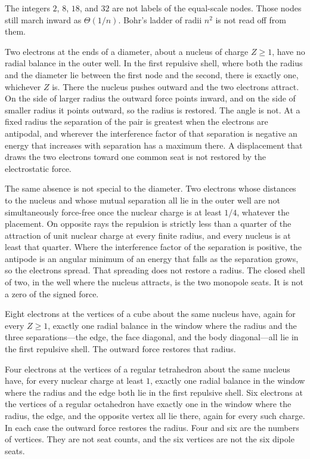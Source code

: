 \documentclass[a4paper]{article}
\begin{document}
The integers \(2\), \(8\), \(18\), and \(32\) are not labels of the equal-scale nodes. Those nodes still march inward as \(\Theta(1/n)\). Bohr's ladder of radii \(n^{2}\) is not read off from them.

Two electrons at the ends of a diameter, about a nucleus of charge \(Z\ge 1\), have no radial balance in the outer well. In the first repulsive shell, where both the radius and the diameter lie between the first node and the second, there is exactly one, whichever \(Z\) is. There the nucleus pushes outward and the two electrons attract. On the side of larger radius the outward force points inward, and on the side of smaller radius it points outward, so the radius is restored. The angle is not. At a fixed radius the separation of the pair is greatest when the electrons are antipodal, and wherever the interference factor of that separation is negative an energy that increases with separation has a maximum there. A displacement that draws the two electrons toward one common seat is not restored by the electrostatic force.

The same absence is not special to the diameter. Two electrons whose distances to the nucleus and whose mutual separation all lie in the outer well are not simultaneously force-free once the nuclear charge is at least \(1/4\), whatever the placement. On opposite rays the repulsion is strictly less than a quarter of the attraction of unit nuclear charge at every finite radius, and every nucleus is at least that quarter. Where the interference factor of the separation is positive, the antipode is an angular minimum of an energy that falls as the separation grows, so the electrons spread. That spreading does not restore a radius. The closed shell of two, in the well where the nucleus attracts, is the two monopole seats. It is not a zero of the signed force.

Eight electrons at the vertices of a cube about the same nucleus have, again for every \(Z\ge 1\), exactly one radial balance in the window where the radius and the three separations---the edge, the face diagonal, and the body diagonal---all lie in the first repulsive shell. The outward force restores that radius.

Four electrons at the vertices of a regular tetrahedron about the same nucleus have, for every nuclear charge at least \(1\), exactly one radial balance in the window where the radius and the edge both lie in the first repulsive shell. Six electrons at the vertices of a regular octahedron have exactly one in the window where the radius, the edge, and the opposite vertex all lie there, again for every such charge. In each case the outward force restores the radius. Four and six are the numbers of vertices. They are not seat counts, and the six vertices are not the six dipole seats.
\end{document}

